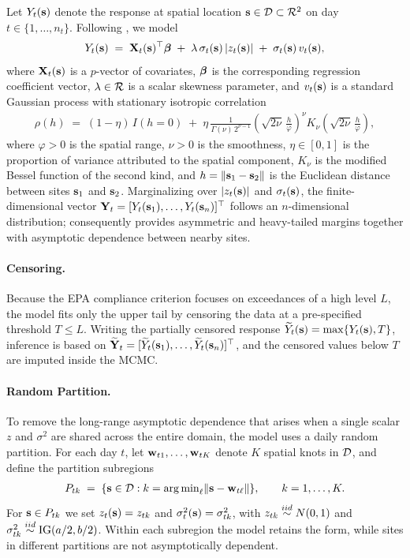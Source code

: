 \documentclass[12pt]{article}
\begin{document}
Let $Y_t(\mbox{\bf s})$ denote the response at spatial location $\mbox{\bf s} \in {\cal D} \subset {\cal R}^2$ on day $t \in \{1, \ldots, n_t\}$.  Following \textcite{morris_space-time_2017}, we model
\begin{align}
  Y_t(\mbox{\bf s}) \;=\; \mbox{\bf X}_t(\mbox{\bf s})^\top \mbox{\boldmath $\beta$} \;+\; \lambda\, \sigma_t(\mbox{\bf s})\, |z_t(\mbox{\bf s})| \;+\; \sigma_t(\mbox{\bf s})\, v_t(\mbox{\bf s}), \label{eq:fullmodel}
\end{align}
where $\mbox{\bf X}_t(\mbox{\bf s})$ is a $p$-vector of covariates, $\mbox{\boldmath $\beta$}$ is the corresponding regression coefficient vector, $\lambda \in {\cal R}$ is a scalar skewness parameter, and $v_t(\mbox{\bf s})$ is a standard Gaussian process with stationary isotropic \Matern correlation
\begin{align}
  \rho(h) \;=\; (1 - \eta)\, I(h = 0) \;+\; \eta\, \frac{1}{\Gamma(\nu)\, 2^{\nu - 1}} \left( \sqrt{2\nu}\, \frac{h}{\varphi} \right)^{\nu} K_\nu\!\left( \sqrt{2\nu}\, \frac{h}{\varphi} \right), \label{eq:matern}
\end{align}
where $\varphi > 0$ is the spatial range, $\nu > 0$ is the smoothness, $\eta \in [0, 1]$ is the proportion of variance attributed to the spatial component, $K_\nu$ is the modified Bessel function of the second kind, and $h = \|\mbox{\bf s}_1 - \mbox{\bf s}_2\|$ is the Euclidean distance between sites $\mbox{\bf s}_1$ and $\mbox{\bf s}_2$.  Marginalizing over $|z_t(\mbox{\bf s})|$ and $\sigma_t(\mbox{\bf s})$, the finite-dimensional vector $\mbox{\bf Y}_t = [Y_t(\mbox{\bf s}_1), \ldots, Y_t(\mbox{\bf s}_n)]^\top$ follows an $n$-dimensional \skewt distribution; consequently  provides asymmetric and heavy-tailed margins together with asymptotic dependence between nearby sites.

\paragraph{Censoring.}
Because the EPA compliance criterion focuses on exceedances of a high level $L$, the model fits only the upper tail by censoring the data at a pre-specified threshold $T \le L$.  Writing the partially censored response $\widetilde{Y}_t(\mbox{\bf s}) = \max\{Y_t(\mbox{\bf s}), T\}$, inference is based on $\widetilde{\mbox{\bf Y}}_t = [\widetilde{Y}_t(\mbox{\bf s}_1), \ldots, \widetilde{Y}_t(\mbox{\bf s}_n)]^\top$, and the censored values below $T$ are imputed inside the MCMC.

\paragraph{Random Partition.}
To remove the long-range asymptotic dependence that arises when a single scalar $z$ and $\sigma^2$ are shared across the entire domain, the model uses a daily random partition.  For each day $t$, let $\mbox{\bf w}_{t1}, \ldots, \mbox{\bf w}_{tK}$ denote $K$ spatial knots in ${\cal D}$, and define the partition subregions
\begin{align}
  P_{tk} \;=\; \{\mbox{\bf s} \in {\cal D} : k = {\mathop{\rm arg\, min}}_\ell \|\mbox{\bf s} - \mbox{\bf w}_{t\ell}\| \}, \qquad k = 1, \ldots, K.
\end{align}
For $\mbox{\bf s} \in P_{tk}$ we set $z_t(\mbox{\bf s}) = z_{tk}$ and $\sigma^2_t(\mbox{\bf s}) = \sigma^2_{tk}$, with $z_{tk} \stackrel{iid}{\sim} N(0, 1)$ and $\sigma^2_{tk} \stackrel{iid}{\sim} \mathrm{IG}(a/2, b/2)$.  Within each subregion the model retains the \skewt form, while sites in different partitions are not asymptotically dependent.
\end{document}
